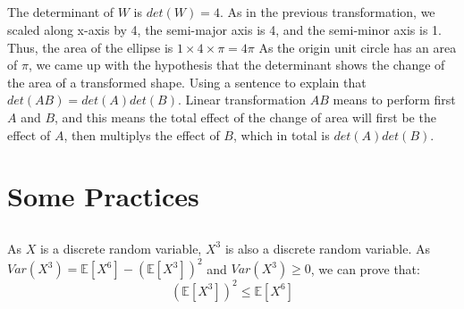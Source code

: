 \documentclass{article}
\begin{document}
\subsection{}\label{sub:} %
The determinant of $ W $ is $ det(W ) = 4 $. As in the previous transformation, we scaled along x-axis by 4, the semi-major axis is 4, and the semi-minor axis is 1. Thus, the area of the ellipse is $ 1 \times 4 \times \pi = 4\pi $ As the origin unit circle has an area of $ \pi  $, we came up with the hypothesis that the determinant shows the change of the area of a transformed shape. Using  a sentence to explain that $ det(AB ) = det(A )det(B ) $. Linear transformation $ AB $ means to perform first $ A $ and $ B $, and this means the total effect of the change of area will first be the effect of $ A  $, then multiplys the effect of $ B $, which in total is $ det(A )det(B) $.
\section{Some Practices}\label{sec:Some Practices} %
\subsection{}\label{sub:} %
As $ X $ is a discrete random variable, $ X^3 $ is also a discrete random variable. As $ Var(X^3) = \mathbb{E}[X^6] - (\mathbb{E}[X^3])^2 $ and $ Var(X^3) \geq 0 $, we can prove that:
\[
(\mathbb{E}[X^3])^2 \leq \mathbb{E}[X^6]
\]
\end{document}
